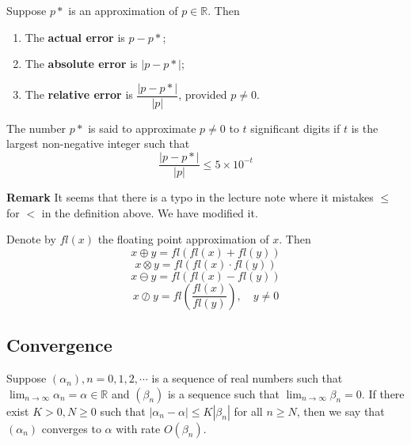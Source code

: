\documentclass[main.tex]{subfiles}
\begin{document}
\begin{definition}
    Suppose $p*$ is an approximation of $p\in \mathbb{R}$. Then 
    \begin{enumerate}
        \item The \textbf{actual error} is $p - p*$;
        \item The \textbf{absolute error} is $|p - p*|$;
        \item The \textbf{relative error} is $\dfrac{|p - p*|}{|p|}$, provided $p\neq 0$.
    \end{enumerate}
    The number $p*$ is said to approximate $p\neq 0$ to $t$ significant digits if $t$ is the largest non-negative integer such that 
    \begin{equation}
        \dfrac{|p - p*|}{|p|} \le 5 \times 10^{-t} 
    \end{equation} 
\end{definition}
\par \noindent \textbf{Remark} It seems that there is a typo in the lecture note where it mistakes $\le$ for $<$ in the definition above. We have modified it. 

\begin{definition}
    Denote by $fl(x)$ the floating point approximation of $x$. Then 
\begin{equation}
    x \oplus y = fl(fl(x) + fl(y))
\end{equation}
\begin{equation}
    x \otimes y = fl(fl(x) \cdot fl(y))
\end{equation}
\begin{equation}
    x \ominus y = fl(fl(x) - fl(y)) 
\end{equation}
\begin{equation}
    x \oslash y = fl\left(\dfrac{fl(x)}{fl(y)}\right), \quad y\neq 0 
\end{equation}
\end{definition}
\subsection{Convergence}
\begin{definition}
    Suppose $(\alpha_n), n = 0, 1, 2, \cdots $ is a sequence of real numbers such that $\lim_{n\to \infty} \alpha_n = \alpha\in \mathbb{R}$ and $(\beta_n)$ is a sequence such that $\lim_{n\to \infty} \beta_n = 0$. If there exist $K>0, N\ge 0$ such that $|\alpha_n - \alpha| \le K |\beta_n|$ for all $n \ge N$, then we say that $(\alpha_n)$ converges to $\alpha$ with rate $O(\beta_n)$. 
\end{definition}
\end{document}
